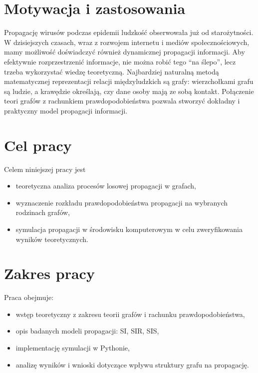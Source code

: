 \section{Motywacja i zastosowania}
Propagację wirusów podczas epidemii ludzkość obserwowała już od starożytności. W dzisiejszych czasach, wraz z rozwojem internetu i mediów społecznościowych, mamy możliwość doświadczyć również dynamicznej propagacji informacji. Aby efektywnie rozprzestrzenić informacje, nie można robić tego ``na ślepo'', lecz trzeba wykorzystać wiedzę teoretyczną. Najbardziej naturalną metodą matematycznej reprezentacji relacji międzyludzkich są grafy: wierzchołkami grafu są ludzie, a krawędzie określają, czy dane osoby mają ze sobą kontakt. Połączenie teori grafów z rachunkiem prawdopodobieństwa pozwala stworzyć dokładny i praktyczny model propagacji informacji.

\section{Cel pracy}
Celem niniejszej pracy jest 
\begin{itemize}
    \item teoretyczna analiza procesów losowej propagacji w grafach,
    \item wyznaczenie rozkładu prawdopodobieństwa propagacji na wybranych rodzinach grafów,
    \item symulacja propagacji w środowisku komputerowym w celu zweryfikowania wyników teoretycznych.
\end{itemize}


\section{Zakres pracy}
Praca obejmuje:
\begin{itemize}
    \item wstęp teoretyczny z zakresu teorii grafów i rachunku prawdopodobieństwa,
    \item opis badanych modeli propagacji: SI, SIR, SIS,
    \item implementację symulacji w Pythonie,
    \item analizę wyników i wnioski dotyczące wpływu struktury grafu na propagację.
\end{itemize}

